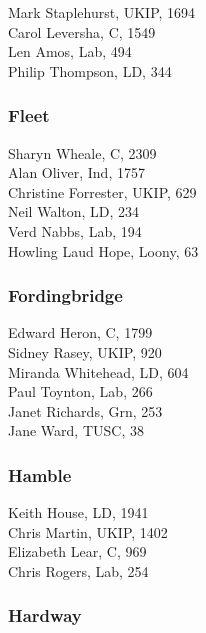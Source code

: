 \documentclass[a4paper,openany,10pt]{book}
\begin{document}
Mark Staplehurst, UKIP, 1694\\
Carol Leversha, C, 1549\\
Len Amos, Lab, 494\\
Philip Thompson, LD, 344\\


\subsubsection*{Fleet}



Sharyn Wheale, C, 2309\\
Alan Oliver, Ind, 1757\\
Christine Forrester, UKIP, 629\\
Neil Walton, LD, 234\\
Verd Nabbs, Lab, 194\\
Howling Laud Hope, Loony, 63\\


\subsubsection*{Fordingbridge}



Edward Heron, C, 1799\\
Sidney Rasey, UKIP, 920\\
Miranda Whitehead, LD, 604\\
Paul Toynton, Lab, 266\\
Janet Richards, Grn, 253\\
Jane Ward, TUSC, 38\\


\subsubsection*{Hamble}



Keith House, LD, 1941\\
Chris Martin, UKIP, 1402\\
Elizabeth Lear, C, 969\\
Chris Rogers, Lab, 254\\


\subsubsection*{Hardway}
\end{document}
